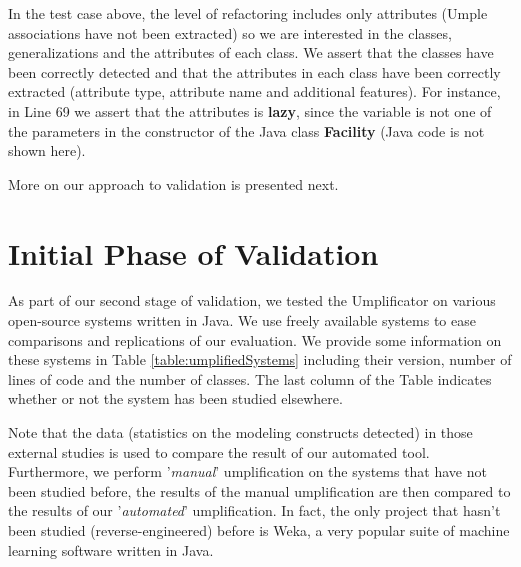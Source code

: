 In the test case above, the level of refactoring includes only attributes (Umple associations have not been extracted) so we are interested in the classes, generalizations and the attributes of each class. We assert that the classes have been correctly detected and that the attributes in each class have been correctly extracted (attribute type, attribute name and additional features). For instance, in Line 69 we assert that the attributes is \textbf{lazy}, since the variable is not one of the parameters in the constructor of the Java class \textbf{Facility} (Java code is not shown here).

More on our approach to validation is presented next.

\section{Initial Phase of Validation}

As part of our second stage of validation, we tested the Umplificator on various open-source systems written in Java. We use freely available systems to ease comparisons and replications of our evaluation. We provide some information on these systems in Table \ref{table:umplifiedSystems} including their version, number of lines of code and the number of classes. The last column of the Table indicates whether or not the system has been studied elsewhere. 

Note that the data (statistics on the modeling constructs detected) in those external studies is used to compare the result of our automated tool. Furthermore, we perform '\textit{manual}' umplification on the systems that have not been studied before, the results of the manual umplification are then compared to the results of our '\textit{automated}' umplification. In fact, the only project that hasn't been studied (reverse-engineered) before is Weka, a very popular suite of machine learning software written in Java. 





